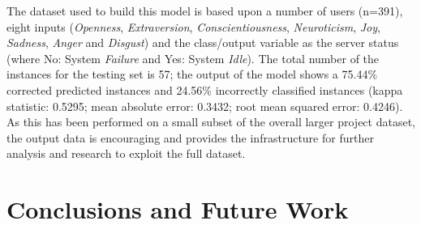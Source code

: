 \documentclass[graybox]{svmult}
\begin{document}
{{{The dataset used to build this model is based upon a number of users
(n=391), eight inputs ({\emph{Openness}}, {\emph{Extraversion}},
{\emph{Conscientiousness}}, {\emph{Neuroticism}}, {\emph{Joy}},
{\emph{Sadness}}, {\emph{Anger}} and {\emph{Disgust}}) and the
class/output variable as the server status (where No: System
{\emph{Failure}} and Yes: System {\emph{Idle}}). The total number of
the instances for the testing set is 57; the output of the model shows
a 75.44\% corrected predicted instances and 24.56\% incorrectly
classified instances (kappa statistic: 0.5295; mean absolute error:
0.3432; root mean squared error: 0.4246). As this has been performed
on a small subset of the overall larger project dataset, the output
data is encouraging and provides the infrastructure for further
analysis and research to exploit the full dataset.

\section{Conclusions and Future Work}\label{conclusions}




}}}
\end{document}
